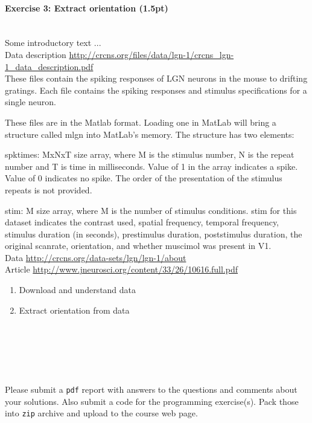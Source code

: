 \documentclass[a4paper,11pt]{article}
\newenvironment{exercise}[3]{\paragraph{Exercise #1: #2 (#3pt)}\ \\}{
\medskip}
\begin{document}
\begin{exercise}{3}{Extract orientation}{1.5}
Some introductory text ...\\
Data description \url{http://crcns.org/files/data/lgn-1/crcns_lgn-1_data_description.pdf}\\

These files contain the spiking responses of LGN neurons in the mouse to 
drifting gratings. Each file contains the spiking responses and stimulus 
specifications for a single neuron. 
 
These files are in the Matlab format. Loading one in MatLab will bring a structure 
called mlgn into MatLab's memory. The structure has two elements: 
 
spktimes: MxNxT size array, where M is the stimulus number, N is the repeat 
number and T is time in milliseconds. Value of 1 in the array indicates 
a spike. Value of 0 indicates no spike. The order of the presentation 
of the stimulus repeats is not provided. 
 
stim: M size array, where M is the number of stimulus conditions. 
stim for this dataset indicates the contrast used, spatial frequency, 
temporal frequency, stimulus duration (in seconds), prestimulus 
duration, poststimulus duration, the original scanrate, orientation, and 
whether muscimol was present in V1. 
\ \\



Data \url{http://crcns.org/data-sets/lgn/lgn-1/about}\\
Article \url{http://www.jneurosci.org/content/33/26/10616.full.pdf}
\begin{enumerate}
\itemsep 0em
	\item Download and understand data
	\item Extract orientation from data
\end{enumerate}
\end{exercise}


\ \\
\ \\
\ \\
\ \\
\ \\
Please submit a \texttt{pdf} report with answers to the questions and comments about your solutions. Also submit a code for the programming exercise(s). Pack those into \texttt{zip} archive and upload to the course web page.
\end{document}

